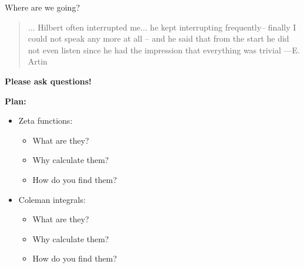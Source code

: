 \begin{frame}
  \titlepage

\end{frame}




\begin{frame}{Where are we going?}
    \begin{quotation}... Hilbert often interrupted me... he kept interrupting frequently--
        finally I could not speak any more at all -- and he said that from the start he
        did not even listen since he had the impression that everything was trivial
        ---E. Artin
    \end{quotation}

    \pause
    \textbf{Please ask questions!}
    \pause

    \textbf{Plan:}
    \begin{itemize}
        \item
            Zeta functions:
            \begin{itemize}
                \item What are they?
                \item Why calculate them?
                \item How do you find them?
            \end{itemize}\pause
        \item
            Coleman integrals:
            \begin{itemize}
                \item What are they?
                \item Why calculate them?
                \item How do you find them?
            \end{itemize}
    \end{itemize}
\end{frame}


